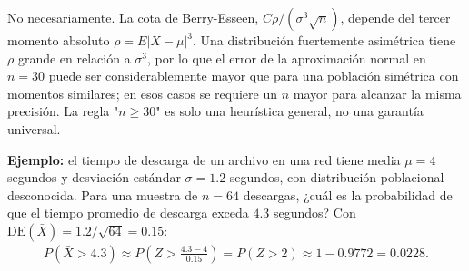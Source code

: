 \begin{solproblema}[prob:0555e27]
	No necesariamente. La cota de Berry-Esseen, $C\rho/(\sigma^3\sqrt n)$, depende del tercer momento absoluto $\rho=E|X-\mu|^3$. Una distribución fuertemente asimétrica tiene $\rho$ grande en relación a $\sigma^3$, por lo que el error de la aproximación normal en $n=30$ puede ser considerablemente mayor que para una población simétrica con momentos similares; en esos casos se requiere un $n$ mayor para alcanzar la misma precisión. La regla "$n\ge30$" es solo una heurística general, no una garantía universal.
\end{solproblema}

\begin{solproblema}[prob:2e2f544]
	\textbf{Ejemplo:} el tiempo de descarga de un archivo en una red tiene media $\mu=4$ segundos y desviación estándar $\sigma=1.2$ segundos, con distribución poblacional desconocida. Para una muestra de $n=64$ descargas, ¿cuál es la probabilidad de que el tiempo promedio de descarga exceda $4.3$ segundos? Con $\text{DE}(\bar X) = 1.2/\sqrt{64} = 0.15$:
	\begin{align*}
		P(\bar X > 4.3) \approx P\left(Z > \frac{4.3-4}{0.15}\right) = P(Z>2) \approx 1-0.9772 = 0.0228.
	\end{align*}
\end{solproblema}
